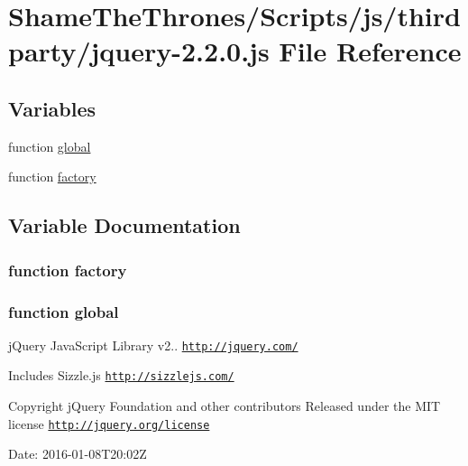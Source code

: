 \hypertarget{jquery-2_82_80_8js}{}\section{Shame\+The\+Thrones/\+Scripts/js/thirdparty/jquery-\/2.2.0.js File Reference}
\label{jquery-2_82_80_8js}
\subsection*{Variables}
\begin{DoxyCompactItemize}
\item 
function \hyperlink{jquery-2_82_80_8js_a57efe929cc6b44042891d05e15cec785}{global}
\item 
function \hyperlink{jquery-2_82_80_8js_abf075bdbe59fd2c3336ed052c9c72b31}{factory}
\end{DoxyCompactItemize}


\subsection{Variable Documentation}
\subsubsection[{\texorpdfstring{factory}{factory}}]{\setlength{\rightskip}{0pt plus 5cm}function factory}\hypertarget{jquery-2_82_80_8js_abf075bdbe59fd2c3336ed052c9c72b31}{}\label{jquery-2_82_80_8js_abf075bdbe59fd2c3336ed052c9c72b31}
\subsubsection[{\texorpdfstring{global}{global}}]{\setlength{\rightskip}{0pt plus 5cm}function global}\hypertarget{jquery-2_82_80_8js_a57efe929cc6b44042891d05e15cec785}{}\label{jquery-2_82_80_8js_a57efe929cc6b44042891d05e15cec785}
j\+Query Java\+Script Library v2.. \href{http://jquery.com/}{\tt http\+://jquery.\+com/}

Includes Sizzle.\+js \href{http://sizzlejs.com/}{\tt http\+://sizzlejs.\+com/}

Copyright j\+Query Foundation and other contributors Released under the M\+IT license \href{http://jquery.org/license}{\tt http\+://jquery.\+org/license}

Date\+: 2016-\/01-\/08\+T20\+:02Z 